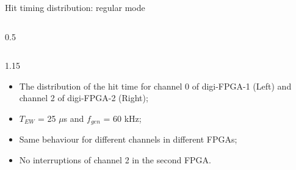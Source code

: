 \documentclass{beamer}
\begin{document}
\begin{frame}{Hit timing distribution: regular mode}
\begin{columns}
\begin{column}{0.5\framewidth}
\begin{figure}[H]
          \label{fig:enter-label} 
          \end{figure} 
   \end{column}
\end{columns}
 \begin{columns}
    \begin{column}{1.15\framewidth}
     \begin{itemize}
      \item The distribution of the hit time for channel 0 of digi-FPGA-1 (Left) and channel 2 of digi-FPGA-2 (Right);
          \item $T_{EW}$ = 25 $\mu$s and $f_{gen}$ = 60 kHz;
        \item Same behaviour for different channels in different FPGAs;
        \item No interruptions of channel 2 in the second FPGA.    \end{itemize}
             \end{column}
\end{columns}     
         
\end{frame}
\end{document}
